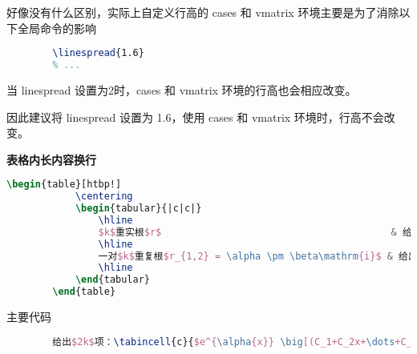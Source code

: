 \documentclass[12pt, a4paper, oneside, UTF8]{ctexbook}
\begin{document}
    好像没有什么区别，实际上自定义行高的 cases 和 vmatrix 环境主要是为了消除以下全局命令的影响
    \begin{lstlisting}[language=TeX]
        % package.tex
        \linespread{1.6}
        % ...
    \end{lstlisting}

    当 linespread 设置为2时，cases 和 vmatrix 环境的行高也会相应改变。

    因此建议将 linespread 设置为 1.6，使用 cases 和 vmatrix 环境时，行高不会改变。
    

    \textbf{表格内长内容换行}

    \begin{lstlisting}[language=TeX]
        \begin{table}[htbp!]
            \centering
            \begin{tabular}{|c|c|}
                \hline
                $k$重实根$r$                                        & 给出$k$项：$e^{rx}(C_1+C_2x+\dots+C_kx^{k-1})$                                         \\
                \hline
                一对$k$重复根$r_{1,2} = \alpha \pm \beta\mathrm{i}$ & 给出$2k$项：\tabincell{c}{$e^{\alpha{x}} \big[(C_1+C_2x+\dots+C_kx^{k-1})\cos\beta{x}$ \\ $+ (D_1+D_2x+\dots+D_kx^{k-1})\sin\beta{x} \big]$} \\
                \hline
            \end{tabular}
        \end{table}
    \end{lstlisting}

    主要代码
    
    \begin{lstlisting}[language=TeX]
        % ...
        给出$2k$项：\tabincell{c}{$e^{\alpha{x}} \big[(C_1+C_2x+\dots+C_kx^{k-1})\cos\beta{x}$ \\ $ + (D_1+D_2x+\dots+D_kx^{k-1})\sin\beta{x} \big]$}
    \end{lstlisting}
\end{document}
